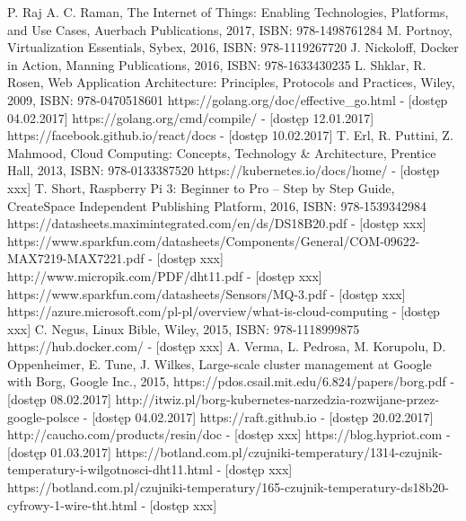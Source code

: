 \documentclass[12pt]{report}
\begin{document}
{
\begin{thebibliography}{99}
	 {P. Raj A. C. Raman, The Internet of Things: Enabling Technologies, Platforms, and Use Cases, Auerbach Publications, 2017, ISBN: 978-1498761284}
	 {M. Portnoy, Virtualization Essentials, Sybex, 2016, ISBN: 978-1119267720}
	 {J. Nickoloff, Docker in Action, Manning Publications, 2016, ISBN: 978-1633430235} 
	 {L. Shklar, R. Rosen, Web Application Architecture: Principles, Protocols and Practices, Wiley, 2009, ISBN: 978-0470518601}
	 {https://golang.org/doc/effective\_go.html - [dostęp 04.02.2017]}
	 {https://golang.org/cmd/compile/ - [dostęp 12.01.2017]}
	 {https://facebook.github.io/react/docs - [dostęp 10.02.2017]}
	 {T. Erl, R. Puttini, Z. Mahmood, Cloud Computing: Concepts, Technology \& Architecture, Prentice Hall, 2013, ISBN: 978-0133387520}
	 {https://kubernetes.io/docs/home/ - [dostęp xxx]}	
	 {T. Short, Raspberry Pi 3: Beginner to Pro – Step by Step Guide, CreateSpace Independent Publishing Platform, 2016, ISBN: 978-1539342984}
	 {https://datasheets.maximintegrated.com/en/ds/DS18B20.pdf - [dostęp xxx]}
	 {https://www.sparkfun.com/datasheets/Components/General/COM-09622-MAX7219-MAX7221.pdf - [dostęp xxx]}
	 {http://www.micropik.com/PDF/dht11.pdf - [dostęp xxx]}
	 {https://www.sparkfun.com/datasheets/Sensors/MQ-3.pdf - [dostęp xxx]}
	 {https://azure.microsoft.com/pl-pl/overview/what-is-cloud-computing - [dostęp xxx]}
	 {C. Negus, Linux Bible, Wiley, 2015, ISBN: 978-1118999875}
	 {https://hub.docker.com/ - [dostęp xxx]}
	 {A. Verma, L. Pedrosa, M. Korupolu, D. Oppenheimer, E. Tune, J. Wilkes, Large-scale cluster management at Google with Borg, Google Inc., 2015, https://pdos.csail.mit.edu/6.824/papers/borg.pdf - [dostęp 08.02.2017]}
	 {http://itwiz.pl/borg-kubernetes-narzedzia-rozwijane-przez-google-polsce - [dostęp 04.02.2017]}
	 {https://raft.github.io - [dostęp 20.02.2017]}
	 {http://caucho.com/products/resin/doc - [dostęp xxx]}
	 {https://blog.hypriot.com - [dostęp 01.03.2017]}
	 {https://botland.com.pl/czujniki-temperatury/1314-czujnik-temperatury-i-wilgotnosci-dht11.html - [dostęp xxx]}
	 {https://botland.com.pl/czujniki-temperatury/165-czujnik-temperatury-ds18b20-cyfrowy-1-wire-tht.html - [dostęp xxx]}

\end{thebibliography}}
\end{document}

